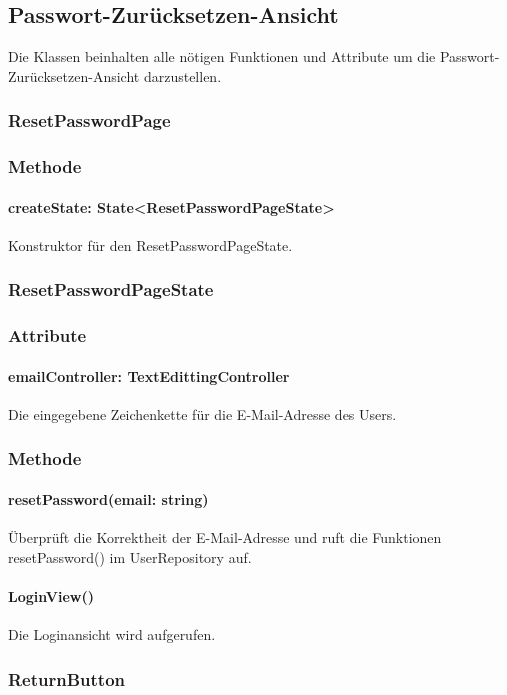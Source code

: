 \documentclass[parskip=full]{scrartcl}
\begin{document}
\newpage

\subsection{Passwort-Zurücksetzen-Ansicht}
Die Klassen beinhalten alle nötigen Funktionen und Attribute um die Passwort-Zurücksetzen-Ansicht darzustellen.

\subsubsection{ResetPasswordPage}
\subsubsection*{Methode}
\paragraph*{createState: State<ResetPasswordPageState>} Konstruktor für den ResetPasswordPageState.

\subsubsection{ResetPasswordPageState}
\subsubsection*{Attribute}
\paragraph*{emailController: TextEdittingController} Die eingegebene Zeichenkette für die E-Mail-Adresse des Users.

\subsubsection*{Methode}
\paragraph*{resetPassword(email: string)} Überprüft die Korrektheit der E-Mail-Adresse und ruft die Funktionen resetPassword() im UserRepository auf.
\paragraph*{LoginView()} Die Loginansicht wird aufgerufen.

\subsubsection{ReturnButton} \label{sec:ReturnButton}
\end{document}
